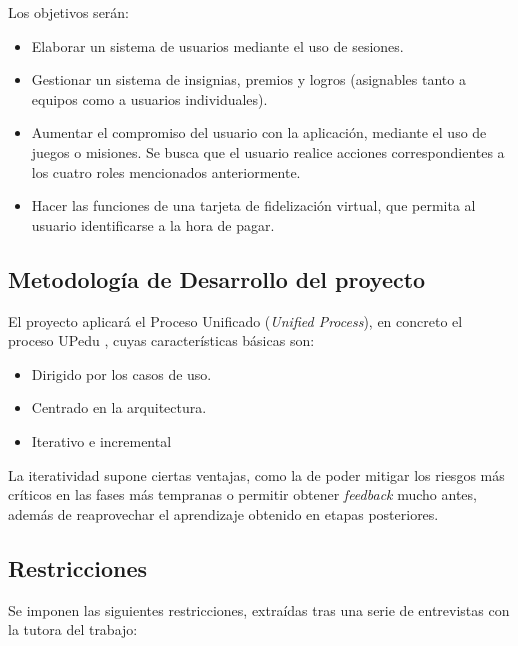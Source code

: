\documentclass[twoside]{report}
\begin{document}
Los objetivos serán:
\begin{itemize}
	\item Elaborar un sistema de usuarios mediante el uso de sesiones.
	\item Gestionar un sistema de insignias, premios y logros (asignables tanto a equipos como a usuarios individuales). 
	\item Aumentar el compromiso del usuario con la aplicación, mediante el uso de juegos o misiones. Se busca que el usuario realice acciones correspondientes a los cuatro roles mencionados anteriormente.
	\item Hacer las funciones de una tarjeta de fidelización virtual, que permita al usuario identificarse a la hora de pagar.
\end{itemize}

\subsection{Metodología de Desarrollo del proyecto}
El proyecto aplicará el Proceso Unificado (\textit{Unified Process}), en concreto el proceso UPedu \cite{upedu}, cuyas características básicas \cite{pgpup} son: 
\begin{itemize}
\item Dirigido por los casos de uso.
\item Centrado en la arquitectura.
\item Iterativo e incremental
\end{itemize}
La iteratividad supone ciertas ventajas, como la de poder mitigar los riesgos más críticos en las fases más tempranas o permitir obtener \textit{feedback} mucho antes, además de reaprovechar el aprendizaje obtenido en etapas posteriores.

\subsection{Restricciones}
Se imponen las siguientes restricciones, extraídas tras una serie de entrevistas con la tutora del trabajo:
\end{document}
